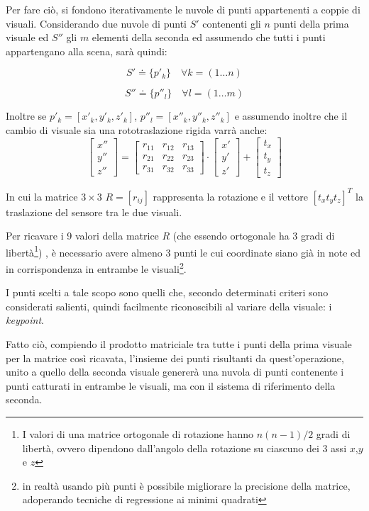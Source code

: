 Per fare ciò, si fondono iterativamente le nuvole di punti appartenenti a coppie di visuali. Considerando due nuvole di punti $S'$ contenenti gli $n$ punti della prima visuale ed $S''$ gli $m$ elementi della seconda ed assumendo che tutti i punti appartengano alla scena, sarà quindi:

$$S' \doteq \{p'_k\} \quad \forall k = (1 \ldots n)$$

$$S'' \doteq \{p''_l \} \quad \forall l = (1\ldots m)$$

Inoltre se $p'_k = [x'_k,y'_k,z'_k]$, $p''_l = [x''_k,y''_k,z''_k]$ e assumendo inoltre che il cambio di visuale sia una rototraslazione rigida varrà anche:
$$ 
\begin{bmatrix} x'' \\	y'' \\z'' \end{bmatrix} = 
\begin{bmatrix}  r_{11}  &  r_{12}  &  r_{13} \\
r_{21}  &  r_{22}  &  r_{23} \\
r_{31}  &  r_{32}  &  r_{33} 
\end{bmatrix} 
\cdot 
\begin{bmatrix} x' \\	y' \\z' \end{bmatrix}
+
\begin{bmatrix} t_x \\	t_y \\t_z \end{bmatrix}
$$

In cui la matrice $3 \! \times \! 3$ $R = [ r_{ij} ] $ rappresenta la rotazione e il vettore $[t_x t_y t_z]^T$ la traslazione del sensore tra le due visuali.

Per ricavare i 9 valori della matrice $R$ (che essendo ortogonale ha 3 gradi di libertà\footnote{I valori di una matrice ortogonale di rotazione hanno $n(n-1)/2$ gradi di libertà, ovvero dipendono dall'angolo della rotazione su ciascuno dei 3 assi $x$,$y$ e $z$ }) , è necessario avere almeno 3 punti le cui coordinate siano già in note ed in corrispondenza in entrambe le visuali\footnote{in realtà usando più punti è possibile migliorare la precisione della matrice, adoperando tecniche di regressione ai minimi quadrati}.

I punti scelti a tale scopo sono quelli che, secondo determinati criteri sono considerati salienti, quindi facilmente riconoscibili al variare della visuale: i \textit{keypoint}.  

Fatto ciò, compiendo il prodotto matriciale tra tutte i punti della prima visuale per la matrice così ricavata, l'insieme dei punti risultanti da quest'operazione, unito a quello della seconda visuale genererà una nuvola di punti contenente i punti catturati in entrambe le visuali, ma con il sistema di riferimento della seconda.